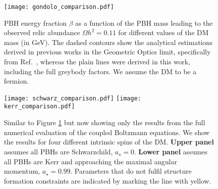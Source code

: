 \documentclass[aps,prd,reprint,twocolumn,preprintnumbers,floatfix,nofootinbib]{revtex4-1}
\begin{document}
\begin{figure}[t!]
 \texttt{[image: gondolo\_comparison.pdf]}
 \caption{PBH energy fraction $\beta$ as a function of the PBH mass leading to the observed relic abundance $\Omega h^2=0.11$ for different values of the DM mass (in GeV). The dashed contours show the analytical estimations derived in previous works in the Geometric Optics limit, specifically from Ref.~\cite{Gondolo:2020uqv}, whereas the plain lines were derived in this work, including the full greybody factors. We assume the DM to be a fermion.}\label{fig:DM_PBH}
\end{figure}
\begin{figure}[t!]
 \texttt{[image: schwarz\_comparison.pdf]}
 \texttt{[image: kerr\_comparison.pdf]}
 \caption{Similar to Figure \ref{fig:DM_PBH} but now showing only the results from the full numerical evaluation of the coupled Boltzmann equations. We show the results for four different intrinsic spins of the DM. \textbf{Upper panel} assumes all PBHs are Schwarzchild, $a_{\star}=0$. \textbf{Lower panel} assumes all PBHs are Kerr and approaching the maximal angular momentum, $a_{\star}=0.99.$ Parameters that do not fulfil structure formation constraints are indicated by marking the line with yellow. }
 \label{fig:DM_PBH_type_schw}
\end{figure}
\end{document}
